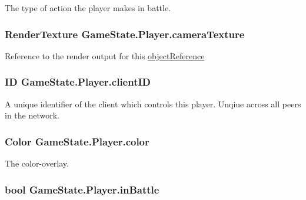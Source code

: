 The type of action the player makes in battle. 

\hypertarget{class_game_state_1_1_player_ac1f7e0b5bc335c32c3be71e3653787a6}{
\subsubsection[{camera\-Texture}]{\setlength{\rightskip}{0pt plus 5cm}Render\-Texture Game\-State.\-Player.\-camera\-Texture}}\label{class_game_state_1_1_player_ac1f7e0b5bc335c32c3be71e3653787a6}


Reference to the render output for this \hyperlink{class_game_state_1_1_player_aebf24de01e14055dc940d0493753484f}{object\-Reference} 

\hypertarget{class_game_state_1_1_player_aacc123df8ea5256f83c1060a5fdd19c2}{
\subsubsection[{client\-I\-D}]{\setlength{\rightskip}{0pt plus 5cm}I\-D Game\-State.\-Player.\-client\-I\-D}}\label{class_game_state_1_1_player_aacc123df8ea5256f83c1060a5fdd19c2}


A unique identifier of the client which controls this player. Unqiue across all peers in the network. 

\hypertarget{class_game_state_1_1_player_a38366fae101c03655d90443f174e362d}{
\subsubsection[{color}]{\setlength{\rightskip}{0pt plus 5cm}Color Game\-State.\-Player.\-color}}\label{class_game_state_1_1_player_a38366fae101c03655d90443f174e362d}


The color-\/overlay. 

\hypertarget{class_game_state_1_1_player_a3cff343fceb3dc315d2371fc8fe25ec6}{
\subsubsection[{in\-Battle}]{\setlength{\rightskip}{0pt plus 5cm}bool Game\-State.\-Player.\-in\-Battle}}\label{class_game_state_1_1_player_a3cff343fceb3dc315d2371fc8fe25ec6}


